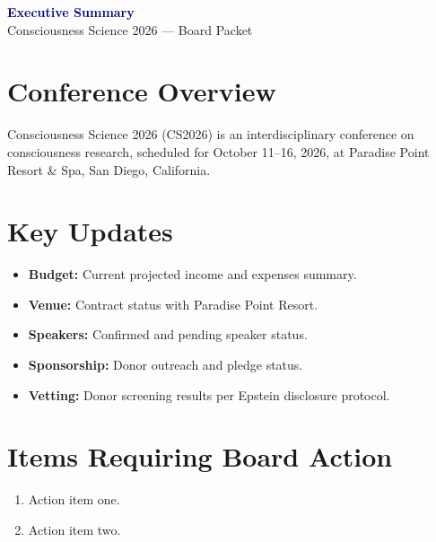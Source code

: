 \documentclass[11pt,letterpaper]{article}
\begin{document}
\begin{center}
{\Large\bfseries\textcolor{navy}{Executive Summary}}\\[6pt]
{\normalsize Consciousness Science 2026 --- Board Packet}
\end{center}

\bigskip


\section*{Conference Overview}

Consciousness Science 2026 (CS2026) is an interdisciplinary conference on consciousness research, scheduled for October 11--16, 2026, at Paradise Point Resort \& Spa, San Diego, California.

\section*{Key Updates}

\begin{itemize}
  \item \textbf{Budget:} Current projected income and expenses summary.
  \item \textbf{Venue:} Contract status with Paradise Point Resort.
  \item \textbf{Speakers:} Confirmed and pending speaker status.
  \item \textbf{Sponsorship:} Donor outreach and pledge status.
  \item \textbf{Vetting:} Donor screening results per Epstein disclosure protocol.
\end{itemize}

\section*{Items Requiring Board Action}

\begin{enumerate}
  \item Action item one.
  \item Action item two.
\end{enumerate}

\end{document}
